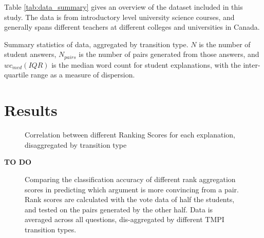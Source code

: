 \documentclass[sigconf]{acmart}
\begin{document}
Table \ref{tab:data_summary} gives an overview of the dataset included in this 
study.
The data is from introductory level university science courses, and generally 
spans different teachers at different colleges and universities in Canada. 
 
\begin{table}
	
	\caption{
		Summary statistics of data, aggregated by transition type. 
		$N$ is the number of student answers, $N_{pairs}$ is the number of 
		pairs generated from those answers, and $wc_{med} (IQR)$ is the median 
		word 
		count 
		for student explanations, with the inter-quartile range as a measure of 
		dispersion. 
	}
	\label{tab:data_summary}
\end{table}

\section{Results}

\begin{figure}
	\scalebox{0.6}{}
	\caption{
		Correlation between different Ranking Scores for each explanation, 
		disaggregated by transition type  
	}
	\label{fig:acc_by_rank_score_type}
\end{figure}

\textbf{TO DO}



\begin{figure}
	\scalebox{0.3}{}
	\caption{
		Comparing the classification accuracy of different rank aggregation 
		scores in predicting which argument is more convincing from a pair. 
		Rank scores are calculated with the vote data of half the students, and 
		tested on the pairs generated by the other half. 
		Data is averaged across all questions, dis-aggregated by different TMPI 
		transition types. 
	}
	\label{fig:acc_by_rank_score_type}
\end{figure}
\end{document}
